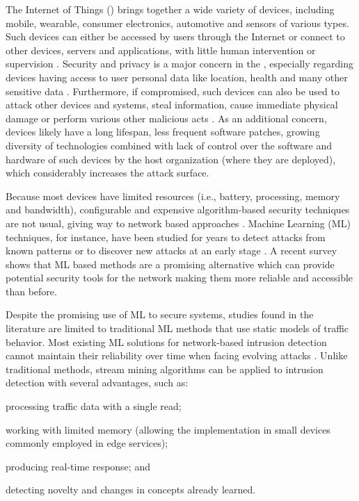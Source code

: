 The Internet of Things (\iot) brings together a wide variety of devices,
including mobile, wearable, consumer electronics, automotive and sensors of
various types.
% 
Such devices can either be accessed by users through the Internet or connect
to other devices, servers and applications,
with little human intervention or supervision
\cite{Tahsien2020,abane2019,haddadpajouh2019survey,Shanbhag2015}.
% 
Security and privacy is a major concern in the \iot, especially regarding
devices having access to user personal data like
location, health and many other sensitive data \cite{sengupta2020comprehensive}.
% 
Furthermore, if compromised, such devices can also be used to attack other
devices and systems, steal information, cause immediate physical damage or
perform various other malicious acts \cite{Kolias2017mirai}.
% 
As an additional concern, \iot devices likely have a long lifespan, less frequent
software patches, growing diversity of technologies combined with lack of
control over the software and hardware of such devices by the host organization
(where they are deployed), which considerably increases the attack surface.

Because most \iot devices have limited resources (i.e., battery, processing,
memory and bandwidth), configurable and expensive algorithm-based
security techniques are not usual, giving way to network based approaches 
\cite{Zhou2017}.
Machine Learning (ML) techniques, for instance, have been studied for years to detect attacks
from known patterns or to discover new attacks at an early stage
\cite{buczak2016survey,mitchell2014survey}.
A recent survey \cite{Tahsien2020} shows that ML based methods are a
promising alternative which can provide potential security tools for the \iot
network making them more reliable and accessible than before.

Despite the promising use of ML to secure \iot systems, studies found in the
literature \cite{buczak2016survey,mitchell2014survey,Tahsien2020} are limited to
traditional ML methods that use static models of traffic behavior.
Most existing ML solutions for network-based intrusion detection cannot maintain
their reliability over time when facing evolving attacks \cite{Viegas2019,AndreoniLopez2019}.
Unlike traditional methods, stream mining algorithms can be applied to intrusion
detection with several advantages, such as:
\begin{enumerate*}[label=(\emph{\roman*})]
    \item processing traffic data with a single read;
    \item working with limited memory (allowing the implementation in small
    devices commonly employed in edge services);
    \item producing real-time response; and
    \item detecting novelty and changes in concepts already learned.
\end{enumerate*}

